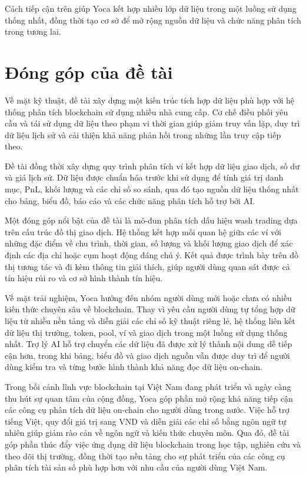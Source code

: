 Cách tiếp cận trên giúp Yoca kết hợp nhiều lớp dữ liệu trong một luồng sử dụng thống nhất, đồng thời tạo cơ sở để mở rộng nguồn dữ liệu và chức năng phân tích trong tương lai.

\section{Đóng góp của đề tài}
\label{sec:dong_gop}

Về mặt kỹ thuật, đề tài xây dựng một kiến trúc tích hợp dữ liệu phù hợp với hệ thống phân tích blockchain sử dụng nhiều nhà cung cấp. Cơ chế điều phối yêu cầu và tái sử dụng dữ liệu theo phạm vi thời gian giúp giảm truy vấn lặp, duy trì dữ liệu lịch sử và cải thiện khả năng phản hồi trong những lần truy cập tiếp theo.

Đề tài đồng thời xây dựng quy trình phân tích ví kết hợp dữ liệu giao dịch, số dư và giá lịch sử. Dữ liệu được chuẩn hóa trước khi sử dụng để tính giá trị danh mục, PnL, khối lượng và các chỉ số so sánh, qua đó tạo nguồn dữ liệu thống nhất cho bảng, biểu đồ, báo cáo và các chức năng phân tích hỗ trợ bởi AI.

Một đóng góp nổi bật của đề tài là mô-đun phân tích dấu hiệu wash trading dựa trên cấu trúc đồ thị giao dịch. Hệ thống kết hợp mối quan hệ giữa các ví với những đặc điểm về chu trình, thời gian, số lượng và khối lượng giao dịch để xác định các địa chỉ hoặc cụm hoạt động đáng chú ý. Kết quả được trình bày trên đồ thị tương tác và đi kèm thông tin giải thích, giúp người dùng quan sát được cả tín hiệu rủi ro và cơ sở hình thành tín hiệu.

Về mặt trải nghiệm, Yoca hướng đến nhóm người dùng mới hoặc chưa có nhiều kiến thức chuyên sâu về blockchain. Thay vì yêu cầu người dùng tự tổng hợp dữ liệu từ nhiều nền tảng và diễn giải các chỉ số kỹ thuật riêng lẻ, hệ thống liên kết dữ liệu thị trường, token, pool, ví và giao dịch trong một luồng sử dụng thống nhất. Trợ lý AI hỗ trợ chuyển các dữ liệu đã được xử lý thành nội dung dễ tiếp cận hơn, trong khi bảng, biểu đồ và giao dịch nguồn vẫn được duy trì để người dùng kiểm tra và từng bước hình thành khả năng đọc dữ liệu on-chain.

Trong bối cảnh lĩnh vực blockchain tại Việt Nam đang phát triển và ngày càng thu hút sự quan tâm của cộng đồng, Yoca góp phần mở rộng khả năng tiếp cận các công cụ phân tích dữ liệu on-chain cho người dùng trong nước. Việc hỗ trợ tiếng Việt, quy đổi giá trị sang VND và diễn giải các chỉ số bằng ngôn ngữ tự nhiên giúp giảm rào cản về ngôn ngữ và kiến thức chuyên môn. Qua đó, đề tài góp phần thúc đẩy việc ứng dụng dữ liệu blockchain trong học tập, nghiên cứu và theo dõi thị trường, đồng thời tạo nền tảng cho sự phát triển của các công cụ phân tích tài sản số phù hợp hơn với nhu cầu của người dùng Việt Nam.

